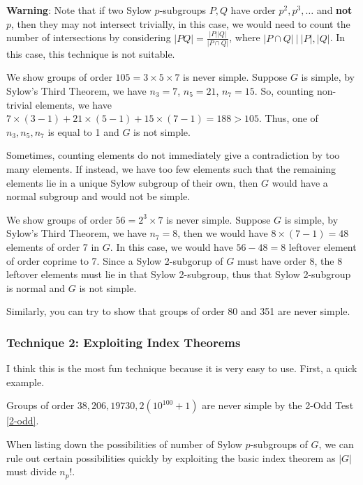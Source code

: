 \textbf{Warning}: Note that if two Sylow $p$-subgroups $P, Q$ have order $p^2, p^3, \hdots$ and \textbf{not} $p$, then they may not intersect trivially, in this case, we would need to count the number of intersections by considering $|PQ| = \frac{|P||Q|}{|P \cap Q|}$, where $|P \cap Q| ~|~ |P|, |Q|$. In this case, this technique is not suitable.

\begin{example}
	We show groups of order $105 = 3 \times 5 \times 7$ is never simple. Suppose $G$ is simple, by Sylow's Third Theorem, we have $n_3 = 7$, $n_5 = 21$, $n_7 = 15$. So, counting non-trivial elements, we have $7 \times (3 - 1) + 21 \times (5 - 1) + 15 \times (7 - 1) = 188 > 105$. Thus, one of $n_3, n_5, n_7$ is equal to 1 and $G$ is not simple.
\end{example}

Sometimes, counting elements do not immediately give a contradiction by too many elements. If instead, we have too few elements such that the remaining elements lie in a unique Sylow subgroup of their own, then $G$ would have a normal subgroup and would not be simple.

\begin{example}
	We show groups of order $56 = 2^3 \times 7$ is never simple. Suppose $G$ is simple, by Sylow's Third Theorem, we have $n_7 = 8$, then we would have $8 \times (7 - 1) = 48$ elements of order 7 in $G$. In this case, we would have $56 - 48 = 8$ leftover element of order coprime to 7. Since a Sylow 2-subgorup of $G$ must have order 8, the 8 leftover elements must lie in that Sylow 2-subgroup, thus that Sylow 2-subgroup is normal and $G$ is not simple.
\end{example}

Similarly, you can try to show that groups of order 80 and 351 are never simple.

\subsubsection{Technique 2: Exploiting Index Theorems}
I think this is the most fun technique because it is very easy to use. First, a quick example.
\begin{example}
	Groups of order $38, 206, 19730, 2(10^100 + 1)$ are never simple by the 2-Odd Test \ref{2-odd}.
\end{example}

When listing down the possibilities of number of Sylow $p$-subgroups of $G$, we can rule out certain possibilities quickly by exploiting the basic index theorem as $|G|$ must divide $n_p!$.

